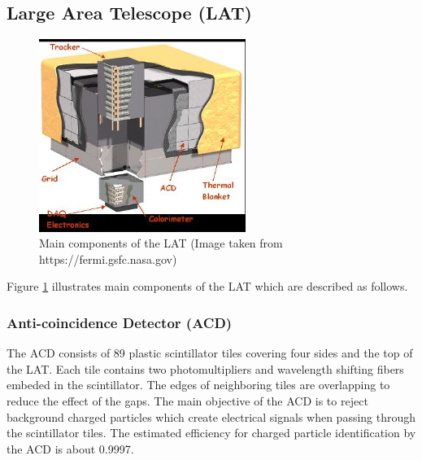 \subsection{Large Area Telescope (LAT)}


\begin{figure}[h!]
    \centering
    \includegraphics[width=0.6\textwidth]{content/background/figures/LATStructure.jpg}
    \caption{Main components of the LAT (Image taken from https://fermi.gsfc.nasa.gov)}
    \label{fig:fermi_lat_structure}
\end{figure}

Figure \ref{fig:fermi_lat_structure} illustrates main components of the LAT
which are described as follows.




\subsubsection{Anti-coincidence Detector (ACD)}
The ACD consists of 89 plastic scintillator tiles covering four
sides and the top of the LAT. Each tile contains two
photomultipliers and wavelength shifting fibers embeded
in the scintillator. The edges of neighboring tiles are
overlapping to reduce the effect of the gaps.
The main objective of the ACD is to reject background
charged particles which create electrical signals when
passing through the scintillator tiles.
The estimated efficiency for charged particle identification
by the ACD is about 0.9997.

